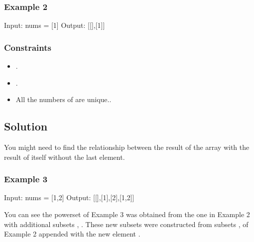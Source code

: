\documentclass[letterpaper,12pt,english]{book}
\begin{document}
\subsubsection{Example 2}
\label{\detokenize{Mathematics/09_MTH_78_Subsets:example-2}}
\begin{sphinxVerbatim}[commandchars=\\\{\}]
Input: nums = [1]
Output: [[],[1]]
\end{sphinxVerbatim}


\subsubsection{Constraints}
\label{\detokenize{Mathematics/09_MTH_78_Subsets:constraints}}\begin{itemize}
\item {} 
\sphinxAtStartPar
{}.

\item {} 
\sphinxAtStartPar
{}.

\item {} 
\sphinxAtStartPar
All the numbers of  are unique..

\end{itemize}


\subsection{Solution}
\label{\detokenize{Mathematics/09_MTH_78_Subsets:solution}}
\sphinxAtStartPar
You might need to find the relationship between the result of the array  with the result of itself without the last element.


\subsubsection{Example 3}
\label{\detokenize{Mathematics/09_MTH_78_Subsets:example-3}}
\begin{sphinxVerbatim}[commandchars=\\\{\}]
Input: nums = [1,2]
Output: [[],[1],[2],[1,2]]
\end{sphinxVerbatim}

\sphinxAtStartPar
You can see the powerset of Example 3 was obtained from the one in Example 2 with additional subsets \sphinxcode{\sphinxupquote{{[}2{]}}}, \sphinxcode{\sphinxupquote{{[}1,2{]}}}. These new subsets were constructed from subsets \sphinxcode{\sphinxupquote{{[}{]}}}, \sphinxcode{\sphinxupquote{{[}1{]}}} of Example 2 appended with the new element .
\end{document}

